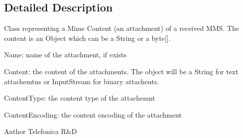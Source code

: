 \subsection{Detailed Description}
Class representing a Mime Content (an attachment) of a received MMS. The content is an Object which can be a String or a byte\mbox{[}\mbox{]}.


\begin{DoxyItemize}
\item Name: name of the attachment, if exists 
\item Content: the content of the attachments. The object will be a String for text attachemtns or InputStream for binary attachents. 
\item ContentType: the content type of the attachemnt 
\item ContentEncoding: the content encoding of the attachment 
\end{DoxyItemize}

\begin{DoxyAuthor}{Author}
Telefonica R\&D 
\end{DoxyAuthor}


